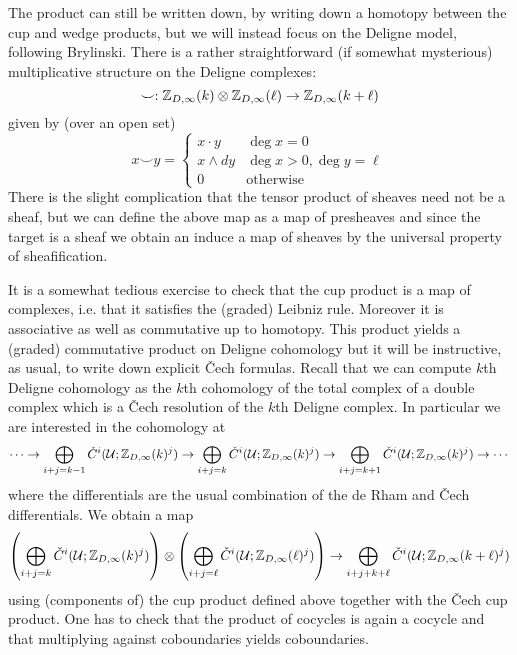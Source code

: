 \documentclass{amsart}
\begin{document}
The product can still be written down, by writing down a homotopy between
the cup and wedge products, but we will instead focus on the Deligne model,
following Brylinski. There is a rather straightforward (if somewhat mysterious)
multiplicative structure on the Deligne complexes:
\begin{equation*}
    \smile : \mathbb{Z}_{D,\infty}(k) \otimes \mathbb{Z}_{D,\infty}(\ell) \to \mathbb{Z}_{D,\infty}(k+\ell)
\end{equation*}
given by (over an open set)
\begin{equation*}
    x\smile y =
    \begin{cases}
        x\cdot y & \deg  x = 0 \\
        x\wedge dy & \deg x>0,\deg y=\ell \\
        0 & \text{otherwise}
    \end{cases}
\end{equation*}
There is the slight complication that the tensor product of sheaves need not
be a sheaf, but we can define the above map as a map of presheaves and since
the target is a sheaf we obtain an induce a map of sheaves by the universal
property of sheafification. 

It is a somewhat tedious exercise to check that the cup product is a map
of complexes, i.e. that it satisfies the (graded) Leibniz rule. Moreover it
is associative as well as commutative up to homotopy.
This product yields a (graded) commutative product on Deligne cohomology 
but it will be instructive, as usual, to write down explicit \v Cech formulas.
Recall that we can compute $k$th Deligne cohomology as the $k$th cohomology
of the total complex of a double complex which is a \v Cech resolution of
the $k$th Deligne complex. In particular we are interested in the cohomology
at
\begin{equation*}
    \cdots \to \bigoplus_{i+j=k-1} \check C^i(\mathcal{U}; \mathbb{Z}_{D,\infty}(k)^j) \to
    \bigoplus_{i+j=k}\check C^i(\mathcal{U}; \mathbb{Z}_{D,\infty}(k)^j) \to
    \bigoplus_{i+j=k+1}\check C^i(\mathcal{U}; \mathbb{Z}_{D,\infty}(k)^j) \to \cdots
\end{equation*}
where the differentials are the usual combination of the de Rham and \v Cech differentials.
We obtain a map
\begin{equation*}
    \left(\bigoplus_{i+j=k}\check C^i(\mathcal{U};\mathbb{Z}_{D,\infty}(k)^j)\right)\otimes
    \left( \bigoplus_{i+j=\ell}\check C^i(\mathcal{U};\mathbb{Z}_{D,\infty}(\ell)^j) \right) \to
    \bigoplus_{i+j+k+\ell}\check C^i(\mathcal{U};\mathbb{Z}_{D,\infty}(k+\ell)^j)
\end{equation*}
using (components of) the cup product defined above together with the \v Cech cup
product. One has to check that the product of cocycles is again a cocycle and that
multiplying against coboundaries yields coboundaries.
\end{document}
